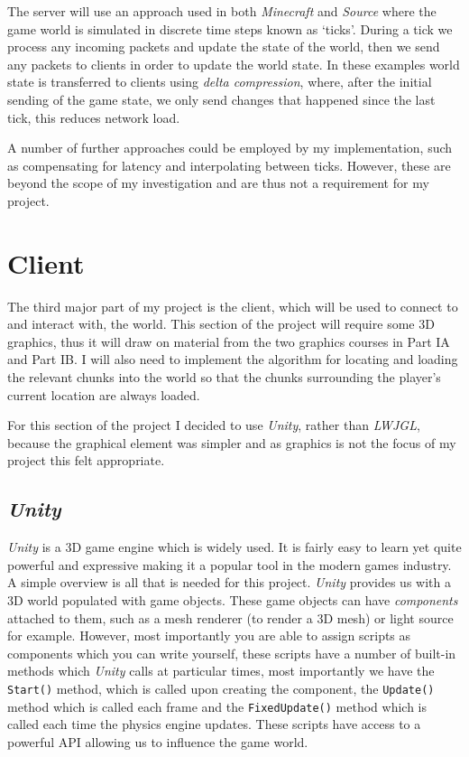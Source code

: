 \documentclass[10pt,twoside,notitlepage,a4paper]{report}
\newcommand{\unity}{\emph{Unity}}
\begin{document}
	The server will use an approach used in both \emph{Minecraft} and \emph{Source} where the game world is simulated in discrete time steps known as `ticks'. During a tick we process any incoming packets and update the state of the world, then we send any packets to clients in order to update the world state. In these examples world state is transferred to clients using \emph{delta compression}, where, after the initial sending of the game state, we only send changes that happened since the last tick, this reduces network load.
	
	A number of further approaches could be employed by my implementation, such as compensating for latency and interpolating between ticks. However, these are beyond the scope of my investigation and are thus not a requirement for my project.

	\section{Client}
	The third major part of my project is the client, which will be used to connect to and interact with, the world. This section of the project will require some 3D graphics, thus it will draw on material from the two graphics courses in Part IA and Part IB. I will also need to implement the algorithm for locating and loading the relevant chunks into the world so that the chunks surrounding the player's current location are always loaded.
	
	For this section of the project I decided to use \unity, rather than \emph{LWJGL}, because the graphical element was simpler and as graphics is not the focus of my project this felt appropriate.
	
	\subsection{\unity}
	\unity{} is a 3D game engine which is widely used. It is fairly easy to learn yet quite powerful and expressive making it a popular tool in the modern games industry. A simple overview is all that is needed for this project. \unity{} provides us with a 3D world populated with game objects. These game objects can have \emph{components} attached to them, such as a mesh renderer (to render a 3D mesh) or light source for example. However, most importantly you are able to assign scripts as components which you can write yourself, these scripts have a number of built-in methods which \unity{} calls at particular times, most importantly we have the {\tt Start()} method, which is called upon creating the component, the {\tt Update()} method which is called each frame and the {\tt FixedUpdate()} method which is called each time the physics engine updates. These scripts have access to a powerful API allowing us to influence the game world.
	
\end{document}
